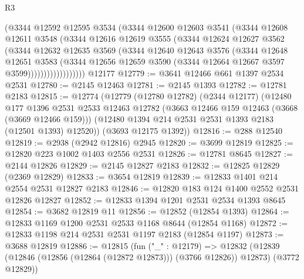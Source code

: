 \begin{lexlean}{R3}
\begin{coremodule}
                    (@3344
                      @12592
                      @12595
                      @3534
                      (@3344
                        @12600
                        @12603
                        @3541
                        (@3344
                          @12608
                          @12611
                          @3548
                          (@3344
                            @12616
                            @12619
                            @3555
                            (@3344
                              @12624
                              @12627
                              @3562
                              (@3344
                                @12632
                                @12635
                                @3569
                                (@3344
                                  @12640
                                  @12643
                                  @3576
                                  (@3344
                                    @12648
                                    @12651
                                    @3583
                                    (@3344
                                      @12656
                                      @12659
                                      @3590
                                      (@3344 @12664 @12667 @3597 @3599))))))))))))))))))
    @12177
@12779 := @3641 @12466 @661 @1397 @2534 @2531
@12780 := @2145 @12463
@12781 := @2145 @1393
@12782 := @12781 @2183
@12815 := @12774
    (@12779
      (@12780 @12782)
      (@2344 @12177)
      (@12480
        @177
        @1396
        @2531
        @2533
        @12463
        @12782
        (@3663 @12466 @159 @12463 (@3668 (@3669 @12466 @159)))
        (@12480 @1394 @214 @2531 @2531 @1393 @2183 (@12501 @1393) @12520))
      (@3693 @12175 @1392))
@12816 := @288 @12540
@12819 := @2938 (@2942 @12816) @2945
@12820 := @3699 @12819
@12825 := @12820 @223 @1002 @1403 @2556 @2531
@12826 := @12781 @8645
@12827 := @2144 @12826
@12829 := @2145 @12827 @2183
@12832 := @12825 @12829 (@2369 @12829)
@12833 := @3654 @12819
@12839 := @12833 @1401 @214 @2554 @2531 @12827 @2183
@12846 := @12820 @183 @124 @1400 @2552 @2531 @12826 @12827
@12852 := @12833 @1394 @1201 @2531 @2534 @1393 @8645
@12854 := @3682 @12819 @11
@12856 := @12852 (@12854 @1393)
@12864 := @12833 @1169 @1200 @2531 @2533 @1168 @8644 (@12854 @1168)
@12872 := @12833 @1198 @214 @2531 @2531 @1197 @2183 (@12854 @1197)
@12873 := @3688 @12819
@12886 := @12815
    (fun ("_" : @12179) =>
    @12832 (@12839 (@12846 (@12856 (@12864 (@12872 @12873))) (@3766 @12826)) @12873) (@3772 @12829))

\end{coremodule}
\end{lexlean}
